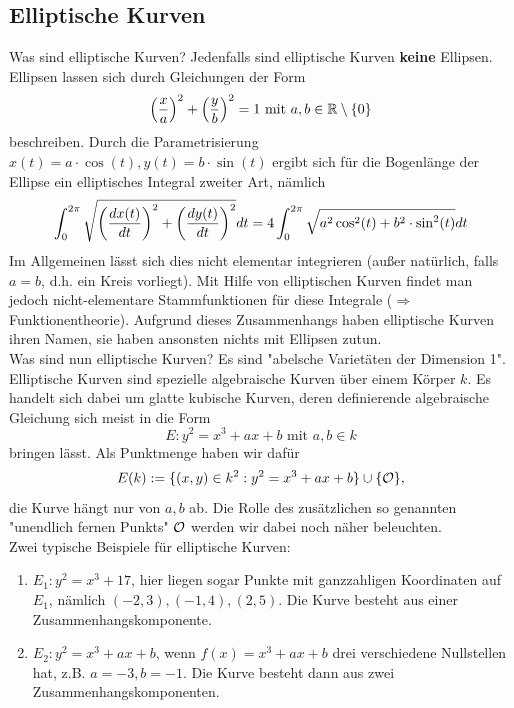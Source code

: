 \subsection*{Elliptische Kurven}
Was sind elliptische Kurven? Jedenfalls sind elliptische Kurven \textbf{keine} Ellipsen. Ellipsen lassen sich durch Gleichungen der Form
\[ \enbrace*{\frac{x}{a}}^2 + \enbrace*{\frac{y}{b}}^2 = 1 \text{ mit } a,b \in \RR \setminus \setnull \]
beschreiben. Durch die Parametrisierung $x(t) = a \cdot \cos(t), y(t) = b \cdot \sin(t)$ ergibt sich für die Bogenlänge der Ellipse ein elliptisches Integral zweiter Art, nämlich
\[ \int_{0}^{2\pi} \sqrt{ \enbrace*{\frac{dx(t)}{dt}}^2 + \enbrace*{\frac{dy(t)}{dt}}^2 } dt = 4 \int_{0}^{2\pi} \sqrt{ a^2 \cos^2(t) + b^2 \cdot \sin^2 (t)} dt \]
Im Allgemeinen lässt sich dies nicht elementar integrieren (außer natürlich, falls $a = b$, d.h. ein Kreis vorliegt). Mit Hilfe von elliptischen Kurven findet man jedoch nicht-elementare Stammfunktionen für diese Integrale ($\Rightarrow$ Funktionentheorie). Aufgrund dieses Zusammenhangs haben elliptische Kurven ihren Namen, sie haben ansonsten nichts mit Ellipsen zutun. \\

Was sind nun elliptische Kurven? Es sind "abelsche Varietäten der Dimension 1". Elliptische Kurven sind spezielle algebraische Kurven über einem Körper $k$. Es handelt sich dabei um glatte kubische Kurven, deren definierende algebraische Gleichung sich meist in die Form
\[ E \colon y^2 = x^3 + ax + b \text{ mit } a,b \in k \]
bringen lässt. Als Punktmenge haben wir dafür
\[ E(k) := \{ (x,y) \in k^2 : y^2 = x^3 + ax + b\} \cup \{ \oh \}, \]
die Kurve hängt nur von $a,b$ ab. Die Rolle des zusätzlichen so genannten "unendlich fernen Punkts" $\oh$ werden wir dabei noch näher beleuchten. \\

Zwei typische Beispiele für elliptische Kurven:
\begin{enumerate}[1)]
	\item $E_1\colon y^2 = x^3 + 17$, hier liegen sogar Punkte mit ganzzahligen Koordinaten auf $E_1$, nämlich $(-2,3), (-1,4), (2,5)$. Die Kurve besteht aus einer Zusammenhangskomponente.
	\item $E_2 \colon y^2 = x^3 + ax + b$, wenn $f(x) = x^3 + ax + b$ drei verschiedene Nullstellen hat, z.B. $a = -3, b= -1$. Die Kurve besteht dann aus zwei Zusammenhangskomponenten.
\end{enumerate}

